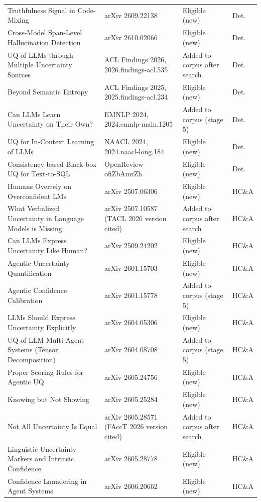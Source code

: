 \documentclass[acmsmall]{acmart}
\begin{document}
\begin{center}
\begin{longtable}{@{}p{5.6cm} p{3.6cm} p{2.4cm} p{0.9cm}@{}}
Truthfulness Signal in Code-Mixing & arXiv 2609.22138 & Eligible (new) & Det. \\
Cross-Model Span-Level Hallucination Detection & arXiv 2610.02066 & Eligible (new) & Det. \\
UQ of LLMs through Multiple Uncertainty Sources & ACL Findings 2026, 2026.findings-acl.535 & Added to corpus after search & Det. \\
Beyond Semantic Entropy & ACL Findings 2025, 2025.findings-acl.234 & Eligible (new) & Det. \\
Can LLMs Learn Uncertainty on Their Own? & EMNLP 2024, 2024.emnlp-main.1205 & Added to corpus (stage 5) & Det. \\
UQ for In-Context Learning of LLMs & NAACL 2024, 2024.naacl-long.184 & Eligible (new) & Det. \\
Consistency-based Black-box UQ for Text-to-SQL & OpenReview ofiZbAmrZh & Eligible (new) & Det. \\
Humans Overrely on Overconfident LMs & arXiv 2507.06306 & Eligible (new) & HC\&A \\
What Verbalized Uncertainty in Language Models is Missing & arXiv 2507.10587 (TACL 2026 version cited) & Added to corpus after search & HC\&A \\
Can LLMs Express Uncertainty Like Human? & arXiv 2509.24202 & Eligible (new) & HC\&A \\
Agentic Uncertainty Quantification & arXiv 2601.15703 & Eligible (new) & HC\&A \\
Agentic Confidence Calibration & arXiv 2601.15778 & Added to corpus (stage 5) & HC\&A \\
LLMs Should Express Uncertainty Explicitly & arXiv 2604.05306 & Eligible (new) & HC\&A \\
UQ of LLM Multi-Agent Systems (Tensor Decomposition) & arXiv 2604.08708 & Added to corpus (stage 5) & HC\&A \\
Proper Scoring Rules for Agentic UQ & arXiv 2605.24756 & Eligible (new) & HC\&A \\
Knowing but Not Showing & arXiv 2605.25284 & Eligible (new) & HC\&A \\
Not All Uncertainty Is Equal & arXiv 2605.28571 (FAccT 2026 version cited) & Added to corpus after search & HC\&A \\
Linguistic Uncertainty Markers and Intrinsic Confidence & arXiv 2605.28778 & Eligible (new) & HC\&A \\
Confidence Laundering in Agent Systems & arXiv 2606.20662 & Eligible (new) & HC\&A \\

\end{longtable}
\end{center}
\end{document}
